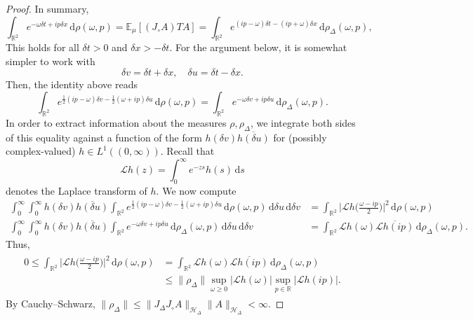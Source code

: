 \documentclass[11pt, letterpaper, reqno]{amsart}
\theoremstyle{definition}
\theoremstyle{remark}
\newcommand{\bbE}{\mathbb{E}}
\newcommand{\bbR}{\mathbb{R}}
\newcommand{\calH}{\mathcal{H}}
\newcommand{\calL}{\mathcal{L}}
\newcommand{\dd}{\,\mathrm{d}}
\begin{document}
\begin{proof}
    In summary, 
    \begin{equation}
        \int_{\bbR^2} e^{-\omega \delta t + i p \delta x} \dd \rho(\omega, p) = \bbE_\mu[(J_\circ A)T A ]=  \int_{\bbR^2} e^{(ip-\omega) \delta t - (ip+\omega) \delta x} \dd \rho_\Delta(\omega,p),
    \end{equation}
    This holds for all $\delta t>0$ and $\delta x>-\delta t$. 
    For the argument below, it is somewhat simpler to work with 
    \begin{equation}
        \delta v=\delta t +\delta x,\quad \delta u=\delta t-\delta x.
    \end{equation}
    Then, the identity above reads
    \begin{equation}
        \int_{\bbR^2} e^{\frac{1}{2}(ip-\omega)\delta v - \frac{1}{2} (\omega+ip)\delta u } \dd \rho(\omega, p) = \int_{\bbR^2} e^{-\omega \delta v +i p \delta u} \dd \rho_\Delta(\omega,p).
    \end{equation}
    In order to extract information about the measures $\rho,\rho_\Delta$, we integrate both sides of this equality against a function of the form $h(\delta v) \overline{h(\delta u)}$ for (possibly complex-valued) $h\in L^1((0,\infty))$. Recall that 
    \begin{equation}
        \calL h(z) = \int_0^\infty e^{-zs} h(s) \dd s 
    \end{equation}
    denotes the Laplace transform of $h$. We now compute 
    \begin{align}
        \int_0^\infty \int_0^\infty h(\delta v) \overline{h(\delta u)} \int_{\bbR^2} e^{\frac{1}{2}(ip-\omega)\delta v - \frac{1}{2} (\omega+ip)\delta u } \dd \rho(\omega, p)  \dd \delta u \dd \delta v &= \int_{\bbR^2} \Big|\calL h\Big(\frac{\omega-ip}{2}\Big)\Big|^2  \dd \rho(\omega,p) \\ 
        \int_0^\infty \int_0^\infty  h(\delta v) \overline{h (\delta u)}\int_{\bbR^2} e^{-\omega \delta v +i p \delta u} \dd \rho_\Delta(\omega,p) \dd \delta u \dd \delta v &= \int_{\bbR^2} \calL h(\omega)\overline{\calL h(ip)} \dd \rho_\Delta(\omega,p) .
    \end{align}
    Thus, 
    \begin{align}\begin{split} 
        0 \leq \int_{\bbR^2} \Big|\calL h\Big(\frac{\omega-ip}{2}\Big)\Big|^2  \dd \rho(\omega,p) &= \int_{\bbR^2} \calL h(\omega)\overline{\calL h(ip)} \dd \rho_\Delta(\omega,p) \\
        &\leq \lVert \rho_\Delta \rVert \sup_{\omega\geq 0} |\calL h(\omega) |  \sup_{p\in \bbR} |\calL h(ip)|.
        \end{split} 
    \end{align}
    By Cauchy--Schwarz, $\lVert \rho_\Delta \rVert \leq \lVert J_\Delta J_\circ A\rVert_{\calH_\Delta}\lVert A \rVert_{\calH_\Delta}<\infty$. 


\end{proof}
\end{document}
